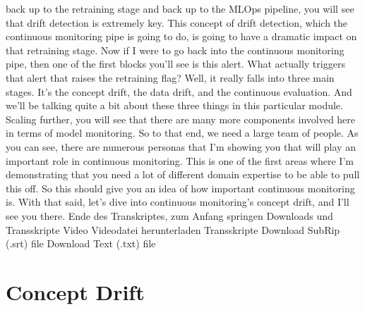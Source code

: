 {{{{{{{{    back up to the retraining stage and back up to the MLOps pipeline,
    you will see that drift detection is extremely key.
    This concept of drift detection, which the continuous monitoring
    pipe is going to do, is going to have a dramatic impact on that retraining
    stage.
    Now if I were to go back into the continuous monitoring pipe,
    then one of the first blocks you'll see is this alert.
    What actually triggers that alert that raises the retraining flag?
    Well, it really falls into three main stages.
    It's the concept drift, the data drift, and the continuous evaluation.
    And we'll be talking quite a bit about these three things
    in this particular module.
    Scaling further, you will see that there are many more components involved here
    in terms of model monitoring.
    So to that end, we need a large team of people.
    As you can see, there are numerous personas
    that I'm showing you that will play an important role
    in continuous monitoring.
    This is one of the first areas where I'm demonstrating
    that you need a lot of different domain expertise to be able to pull this off.
    So this should give you an idea of how important continuous monitoring is.
    With that said, let's dive into continuous monitoring's concept drift,
    and I'll see you there.
    Ende des Transkriptes, zum Anfang springen
    Downloads und Transskripte
    Video
    Videodatei herunterladen
    Transskripte
    Download SubRip (.srt) file
    Download Text (.txt) file

\section{Concept Drift}

}}}}}}}}
